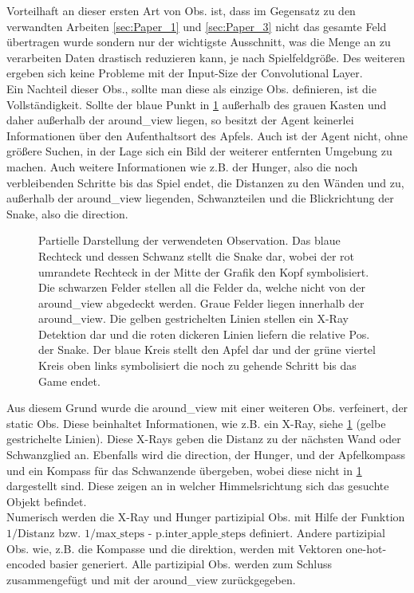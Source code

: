 Vorteilhaft an dieser ersten Art von Obs. ist, dass im Gegensatz zu den verwandten Arbeiten \ref{sec:Paper_1} und \ref{sec:Paper_3} nicht das gesamte Feld übertragen wurde sondern nur der wichtigste Ausschnitt, was die Menge an zu verarbeiten Daten drastisch reduzieren kann, je nach Spielfeldgröße. Des weiteren ergeben sich keine Probleme mit der Input-Size der Convolutional Layer.\\
Ein Nachteil dieser Obs., sollte man diese als einzige Obs. definieren, ist die Vollständigkeit. Sollte der blaue Punkt in \ref{fig:Observation} außerhalb des grauen Kasten und daher außerhalb der around\_view liegen, so besitzt der Agent keinerlei Informationen über den Aufenthaltsort des Apfels. Auch ist der Agent nicht, ohne größere Suchen, in der Lage sich ein Bild der weiterer entfernten Umgebung zu machen. 
Auch weitere Informationen wie z.B. der Hunger, also die noch verbleibenden Schritte bis das Spiel endet, die Distanzen zu den Wänden und zu, außerhalb der around\_view liegenden, Schwanzteilen und die Blickrichtung der Snake, also die direction.
\begin{figure}[H]
	\centering
	\def\svgscale{0.95}
	
	\caption[Observation]{Partielle Darstellung der verwendeten Observation. Das blaue Rechteck und dessen Schwanz stellt die Snake dar, wobei der rot umrandete Rechteck in der Mitte der Grafik den Kopf symbolisiert. Die schwarzen Felder stellen all die Felder da, welche nicht von der around\_view abgedeckt werden. Graue Felder liegen innerhalb der around\_view. Die gelben gestrichelten Linien stellen ein X-Ray Detektion dar und die roten dickeren Linien liefern die relative Pos. der Snake. Der blaue Kreis stellt den Apfel dar und der grüne viertel Kreis oben links symbolisiert die noch zu gehende Schritt bis das Game endet.}
	\label{fig:Observation}
\end{figure}
Aus diesem Grund wurde die around\_view mit einer weiteren Obs. verfeinert, der static Obs. Diese beinhaltet Informationen, wie z.B. ein X-Ray, siehe \ref{fig:Observation} (gelbe gestrichelte Linien). Diese X-Rays geben die Distanz zu der nächsten Wand oder Schwanzglied an. Ebenfalls wird die direction, der Hunger, und der Apfelkompass und ein Kompass für das Schwanzende übergeben, wobei diese nicht in \ref{fig:Observation} dargestellt sind. Diese zeigen an in welcher Himmelsrichtung sich das gesuchte Objekt befindet.\\
Numerisch werden die X-Ray und Hunger partizipial Obs. mit Hilfe der Funktion $1 / \text{Distanz}$ bzw. $1 / \text{max\_steps - p.inter\_apple\_steps}$ definiert. Andere partizipial Obs. wie, z.B. die Kompasse und die direktion, werden mit Vektoren one-hot-encoded basier generiert. Alle partizipial Obs. werden zum Schluss zusammengefügt und mit der around\_view zurückgegeben.


